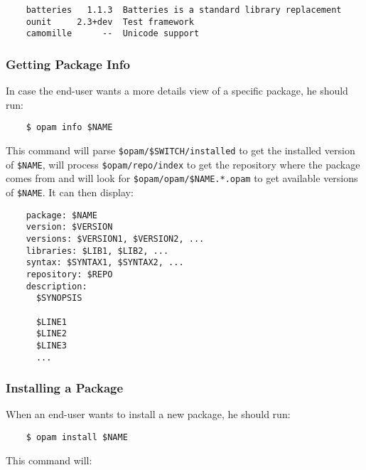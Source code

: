 \documentclass[a4paper,11pt]{article}
\begin{document}
\begin{verbatim}
    batteries   1.1.3  Batteries is a standard library replacement
    ounit     2.3+dev  Test framework
    camomille      --  Unicode support
\end{verbatim}

\subsubsection{Getting Package Info}

In case the end-user wants a more details view of a specific package,
he should run:

\begin{verbatim}
    $ opam info $NAME
\end{verbatim}

This command will parse \verb+$opam/$SWITCH/installed+ to get the
installed version of \verb+$NAME+, will process
\verb+$opam/repo/index+ to get the repository where the package comes
from and will look for \verb+$opam/opam/$NAME.*.opam+ to get available
versions of \verb+$NAME+. It can then display:

\begin{verbatim}
    package: $NAME
    version: $VERSION
    versions: $VERSION1, $VERSION2, ...
    libraries: $LIB1, $LIB2, ...
    syntax: $SYNTAX1, $SYNTAX2, ...
    repository: $REPO
    description:
      $SYNOPSIS

      $LINE1
      $LINE2
      $LINE3
      ...
\end{verbatim}

\subsubsection{Installing a Package}
\label{opam-install}

When an end-user wants to install a new package, he should run:

\begin{verbatim}
    $ opam install $NAME
\end{verbatim}

This command will:
\end{document}
